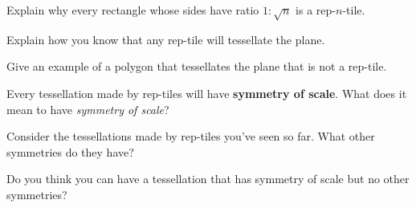 \documentclass[handout,nooutcomes,noauthor]{ximera}
\begin{document}
\begin{problem}
Explain why every rectangle whose sides have ratio $1:\sqrt{n}$ is a
rep-$n$-tile.
\end{problem}

\begin{problem}
Explain how you know that any rep-tile will tessellate the plane.
\end{problem}

\begin{problem}
Give an example of a polygon that tessellates the plane that is not a
rep-tile.
\end{problem}


\begin{problem}
Every tessellation made by rep-tiles will have \textbf{symmetry of scale}. What does it mean to have \textit{symmetry of scale}?
\end{problem}

\begin{problem}
Consider the tessellations made by rep-tiles you've seen so far. What
other symmetries do they have?
\end{problem}

\begin{problem}
Do you think you can have a tessellation that has symmetry of scale
but no other symmetries?
\end{problem}
\end{document}
